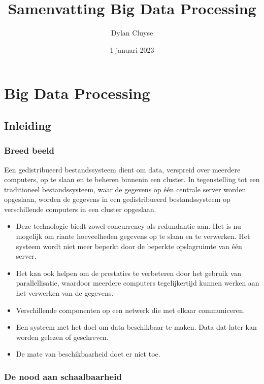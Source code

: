 \documentclass[a4paper,10pt,twoside]{report}
\title{Samenvatting Big Data Processing}
\author{Dylan {Cluyse}}
\date{1 januari 2023}
\begin{document}
	
\maketitle

\tableofcontents
	
\chapter{Big Data Processing}

\section{Inleiding}

\subsection{Breed beeld}

Een gedistribueerd bestandssysteem dient om data, verspreid over meerdere computers, op te slaan en te beheren binnenin een cluster. In tegenstelling tot een traditioneel bestandssysteem, waar de gegevens op één centrale server worden opgeslaan, worden de gegevens in een gedistribueerd bestandssysteem op verschillende computers in een cluster opgeslaan. 

\begin{itemize}
	\item Deze technologie biedt zowel concurrency als redundantie aan. Het is nu mogelijk om riante hoeveelheden gegevens op te slaan en te verwerken. Het systeem wordt niet meer beperkt door de beperkte opslagruimte van één server.
	\item Het kan ook helpen om de prestaties te verbeteren door het gebruik van parallellisatie, waardoor meerdere computers tegelijkertijd kunnen werken aan het verwerken van de gegevens.
	\item Verschillende componenten op een netwerk die met elkaar communiceren.
	\item Een systeem met het doel om data beschikbaar te maken. Data dat later kan worden gelezen of geschreven.
	\item De mate van beschikbaarheid doet er niet toe.
\end{itemize}

\subsection{De nood aan schaalbaarheid}
\end{document}
